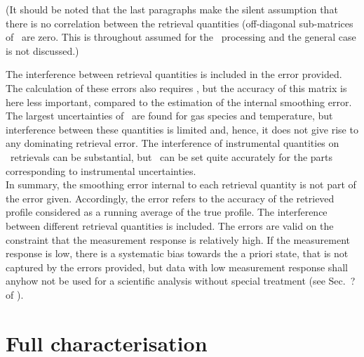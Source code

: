 (It should be noted that the last paragraphs make the silent assumption that
there is no correlation between the retrieval quantities (off-diagonal
sub-matrices of \aCvrMtr{\VctStl{\SttVct}}\ are zero. This is throughout
assumed for the \SMR\ processing and the general case is not discussed.)

The interference between retrieval quantities is included in the error
provided. The calculation of these errors also requires \aCvrMtr{\SttVct}, but
the accuracy of this matrix is here less important, compared to the estimation
of the internal smoothing error. The largest uncertainties of
\aCvrMtr{\SttVct}\ are found for gas species and temperature, but interference
between these quantities is limited and, hence, it does not give rise to any
dominating retrieval error. The interference of instrumental quantities on
\VMR\ retrievals can be substantial, but \aCvrMtr{\SttVct}\ can be
set quite accurately for the parts corresponding to instrumental uncertainties.\\

\noindent
In summary, the smoothing error internal to each retrieval quantity is not part
of the error given. Accordingly, the error refers to the accuracy of the
retrieved profile considered as a running average of the true profile. The
interference between different retrieval quantities is included. The errors are
valid on the constraint that the measurement response is relatively high. If
the measurement response is low, there is a systematic bias towards the a
priori state, that is not captured by the errors provided, but data with
low measurement response shall anyhow not be used for a scientific analysis
without special treatment (see Sec.~? of \citet{rodgers:00}).



\section{Full characterisation}
%


